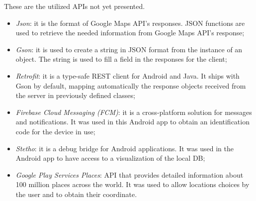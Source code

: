 These are the utilized APIs not yet presented.
\begin{itemize}
\item \textit{Json}: it is the format of Google Maps API’s responses. JSON functions are used to retrieve the needed information from Google Maps API’s response;
\item \textit{Gson}: it is used to create a string in JSON format from the instance of an object. The string is used to fill a field in the responses for the client;
\item \textit{Retrofit}: it is a type-safe REST client for Android and Java. It ships with Gson by default, mapping automatically the response objects received from the server in previously defined classes;
\item \textit{Firebase Cloud Messaging (FCM)}: it is a cross-platform solution for messages and notifications. It was used in this Android app to obtain an identification code for the device in use;
\item \textit{Stetho}: it is a debug bridge for Android applications. It was used in the Android app to have access to a visualization of the local DB;
\item \textit{Google Play Services Places}: API that provides detailed information about 100 million places across the world. It was used to allow locations choices by the user and to obtain their coordinate.
\end{itemize}